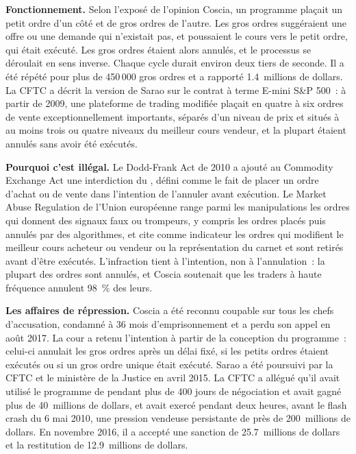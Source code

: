 \textbf{Fonctionnement.} Selon l'exposé de l'opinion Coscia, un programme plaçait un petit ordre d'un côté et de gros ordres de l'autre. Les gros ordres
suggéraient une offre ou une demande qui n'existait pas, et poussaient le cours vers le petit ordre, qui était exécuté. Les gros ordres étaient alors annulés,
et le processus se déroulait en sens inverse. Chaque cycle durait environ deux tiers de seconde. Il a été répété pour plus de 450\,000 gros ordres et a rapporté
1.4~millions de dollars. La CFTC a décrit la version de Sarao sur le contrat à terme E-mini S\&P 500~: à partir de 2009, une plateforme de trading modifiée plaçait en  quatre à six ordres de vente exceptionnellement
importants, séparés d'un niveau de prix et situés à au moins trois ou quatre niveaux du meilleur cours vendeur, et la plupart étaient annulés sans avoir été exécutés.

\textbf{Pourquoi c'est illégal.} Le Dodd-Frank Act de 2010 a ajouté au Commodity Exchange Act une interdiction du , défini comme le fait de placer un ordre d'achat ou de vente dans l'intention
de l'annuler avant exécution. Le Market Abuse Regulation de l'Union européenne range parmi les manipulations les ordres qui donnent des signaux faux ou trompeurs, y compris
les ordres placés puis annulés par des algorithmes, et cite comme indicateur les ordres qui modifient le meilleur cours acheteur ou vendeur ou la représentation du carnet et sont
retirés avant d'être exécutés. L'infraction tient à l'intention, non à l'annulation~: la plupart des ordres sont annulés, et Coscia soutenait que les traders à haute fréquence
annulent 98~\% des leurs.

\textbf{Les affaires de répression.} Coscia a été reconnu coupable sur tous les chefs d'accusation, condamné à 36 mois d'emprisonnement et a perdu son appel en août 2017. La cour a retenu l'intention
à partir de la conception du programme~: celui-ci annulait les gros ordres après un délai fixé, si les petits ordres étaient exécutés ou si un gros ordre unique était exécuté. Sarao a été poursuivi
par la CFTC et le ministère de la Justice en avril 2015. La CFTC a allégué qu'il avait utilisé le programme de  pendant plus de 400 jours de négociation et avait gagné plus de
40~millions de dollars, et avait exercé pendant deux heures, avant le flash crash du 6 mai 2010, une pression vendeuse persistante de près de 200~millions de dollars. En novembre 2016, il
a accepté une sanction de 25.7~millions de dollars et la restitution de 12.9~millions de dollars.

